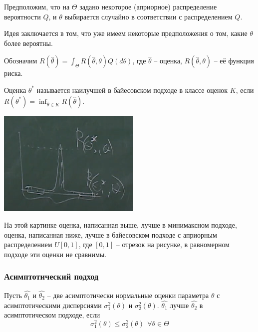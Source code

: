Предположим, что на $\Theta$ задано некоторое (априорное) распределение вероятности $Q$, и $\theta$ выбирается случайно в соответствии с распределением $Q$.

Идея заключается в том, что уже имеем некоторые предположения о том, какие $\theta$ более вероятны.

Обозначим $R(\hat{\theta}) = \int_\Theta R(\hat{\theta}, \theta) Q(d \theta)$, где $\hat{\theta}$ -- оценка, $R(\hat{\theta}, \theta)$ -- её функция риска.

\begin{definition}
    Оценка $\theta^*$ называется наилучшей в байесовском подходе в классе оценок $K$, если $R(\theta^*) = \inf_{\hat{\theta} \in K} R(\hat{\theta})$.
\end{definition}

\begin{example}
    \includegraphics{images/picture1.png}

    На этой картинке оценка, написанная выше, лучше в минимаксном подходе, оценка, написанная ниже, лучше в байесовском подходе с априорным распределением $U[0, 1]$, где $[0, 1]$ -- отрезок на рисунке, в равномерном подходе эти оценки не сравнимы.
\end{example}

\subsubsection{Асимптотический подход}

\begin{definition}
    Пусть $\hat{\theta_1}$ и $\hat{\theta_2}$ -- две асимптотически нормальные оценки параметра $\theta$ с асимптотическими дисперсиями $\sigma_1^2(\theta)$ и $\sigma_2^2(\theta)$. $\hat{\theta_1}$ лучше $\hat{\theta_2}$ в асимптотическом подходе, если
    \[
        \sigma_1^2(\theta) \le \sigma_2^2(\theta) \ \ \forall \theta \in \Theta
    \]
\end{definition}

